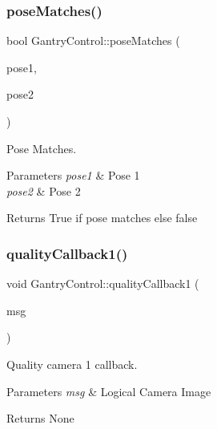 \subsubsection{\texorpdfstring{pose\+Matches()}{poseMatches()}}
{\footnotesize\ttfamily bool Gantry\+Control\+::pose\+Matches (\begin{DoxyParamCaption}\item[{const geometry\+\_\+msgs\+::\+Pose \&}]{pose1,  }\item[{const geometry\+\_\+msgs\+::\+Pose \&}]{pose2 }\end{DoxyParamCaption})}



Pose Matches. 


\begin{DoxyParams}{Parameters}
{\em pose1} & Pose 1 \\
\hline
{\em pose2} & Pose 2 \\
\hline
\end{DoxyParams}
\begin{DoxyReturn}{Returns}
True if pose matches else false 
\end{DoxyReturn}
\mbox{\label{classGantryControl_a6557b18bde7b776e6a05fe85d9e858d9}} 
\subsubsection{\texorpdfstring{quality\+Callback1()}{qualityCallback1()}}
{\footnotesize\ttfamily void Gantry\+Control\+::quality\+Callback1 (\begin{DoxyParamCaption}\item[{const nist\+\_\+gear\+::\+Logical\+Camera\+Image \&}]{msg }\end{DoxyParamCaption})}



Quality camera 1 callback. 


\begin{DoxyParams}{Parameters}
{\em msg} & Logical Camera Image \\
\hline
\end{DoxyParams}
\begin{DoxyReturn}{Returns}
None 
\end{DoxyReturn}
\mbox{\label{classGantryControl_a355b299969bfa74073062ba1c6c1ec04}} 
